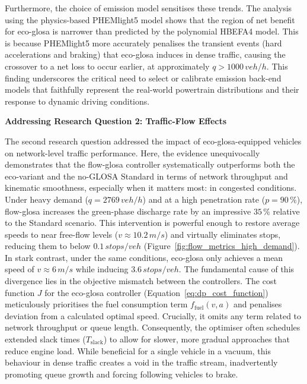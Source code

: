 \mynewline
Furthermore, the choice of emission model sensitises these trends. The analysis using the physics-based PHEMlight5 model shows that the region of net benefit for \ac{eco-glosa} is narrower than predicted by the polynomial HBEFA4 model. This is because PHEMlight5 more accurately penalises the transient events (hard accelerations and braking) that \ac{eco-glosa} induces in dense traffic, causing the crossover to a net loss to occur earlier, at approximately $q > 1000\,\unit{veh/h}$. This finding underscores the critical need to select or calibrate emission back-end models that faithfully represent the real-world powertrain distributions and their response to dynamic driving conditions.

\bigskip
\textbf{Addressing Research Question 2: Traffic-Flow Effects}

The second research question addressed the impact of \ac{eco-glosa}-equipped vehicles on network-level traffic performance. Here, the evidence unequivocally demonstrates that the \ac{flow-glosa} controller systematically outperforms both the eco-variant and the no-GLOSA Standard in terms of network throughput and kinematic smoothness, especially when it matters most: in congested conditions.
\mynewline
Under heavy demand ($q = 2769\,\unit{veh/h}$) and at a high penetration rate ($p=90\,\%$), \ac{flow-glosa} increases the green-phase discharge rate by an impressive $35\,\%$ relative to the Standard scenario. This intervention is powerful enough to restore average speeds to near free-flow levels ($v\approx10.2\,\unit{m/s}$) and virtually eliminates stops, reducing them to below $0.1\,\unit{stops/veh}$ (Figure~\ref{fig:flow_metrics_high_demand}). In stark contrast, under the same conditions, \ac{eco-glosa} only achieves a mean speed of $v\approx6\,\unit{m/s}$ while inducing $3.6\,\unit{stops/veh}$.
\mynewline
The fundamental cause of this divergence lies in the objective mismatch between the controllers. The cost function $J$ for the \ac{eco-glosa} controller (Equation~\ref{eq:dp_cost_function}) meticulously prioritises the fuel consumption term $f_\mathrm{fuel}(v,a)$ and penalises deviation from a calculated optimal speed. Crucially, it omits any term related to network throughput or queue length. Consequently, the optimiser often schedules extended slack times ($T_\mathrm{slack}$) to allow for slower, more gradual approaches that reduce engine load. While beneficial for a single vehicle in a vacuum, this behaviour in dense traffic creates a void in the traffic stream, inadvertently promoting queue growth and forcing following vehicles to brake.
